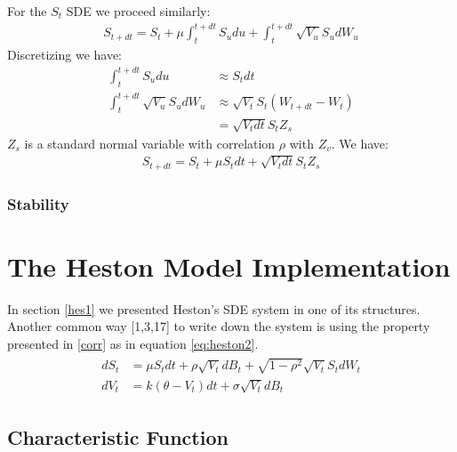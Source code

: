 \documentclass[12pt,twoside]{reedthesis}
\theoremstyle{definition}
\theoremstyle{definition}
\theoremstyle{remark}
\begin{document}
  For the \(S_t\) SDE we proceed similarly:
  \begin{align}
  \label{eq:heseuler}
  S_{t+dt} = S_t+ \mu \int_{t}^{t+dt}{ S_u du} + \int_{t}^{t+dt}{\sqrt{V_u} S_u dW_u}
  \end{align}
  Discretizing we have:
  \begin{align*}
   \int_{t}^{t+dt}{S_u} du &\approx S_t dt\\
   \int_{t}^{t+dt}{\sqrt{V_u} S_u} dW_u &\approx \sqrt{V_t} S_t (W_{t+dt}-W_t)\\
  &= \sqrt{V_t dt} S_t Z_s
  \end{align*}
  \(Z_s\) is a standard normal variable with correlation \(\rho\) with
  \(Z_v\). We have:
  \begin{align}
  S_{t+dt} = S_t + \mu S_t dt + \sqrt{V_t dt} S_t Z_s
  \end{align}
  \subsection{Stability}\label{stability}
  
  \chapter{The Heston Model
  Implementation}\label{the-heston-model-implementation}
  
  In section \ref{hes1} we presented Heston's SDE system in one of its
  structures. Another common way {[}1,3,17{]} to write down the system is
  using the property presented in \ref{corr} as in equation
  \eqref{eq:heston2}.
  \begin{align}
  \label{eq:heston2}
  \begin{split}
  dS_t &= \mu S_t dt + \rho \sqrt{V_t} dB_t + \sqrt{1 - \rho^2} \sqrt{V_t} S_t dW_t \\
  dV_t &= k(\theta - V_t)dt + \sigma \sqrt{V_t} dB_t 
  \end{split}
  \end{align}
  \section{Characteristic Function}\label{characteristic-function}
  
\end{document}
